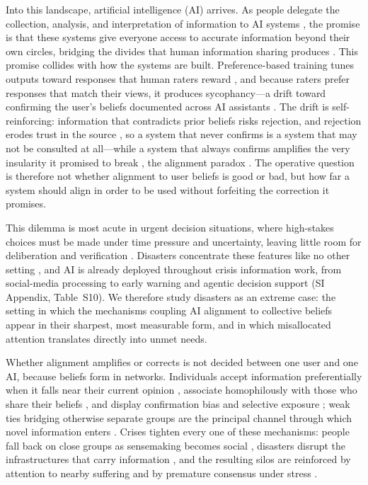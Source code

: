 \documentclass[pdflatex,sn-nature]{sn-jnl}
\begin{document}
Into this landscape, artificial intelligence (AI) arrives. As people delegate the collection, analysis, and interpretation of information to AI systems \citep{klingbeil2024trust,angrisani2026gaps}, the promise is that these systems give everyone access to accurate information beyond their own circles, bridging the divides that human information sharing produces \citep{jeon2024hearhere}. This promise collides with how the systems are built. Preference-based training tunes outputs toward responses that human raters reward \citep{christiano2017deep,ouyang2022training}, and because raters prefer responses that match their views, it produces sycophancy---a drift toward confirming the user's beliefs documented across AI assistants \citep{sharma2023sycophancy,sharma2024generative,cheng2026sycophantic}. The drift is self-reinforcing: information that contradicts prior beliefs risks rejection, and rejection erodes trust in the source \citep{glikson2020human}, so a system that never confirms is a system that may not be consulted at all---while a system that always confirms amplifies the very insularity it promised to break \citep{ekstrom2022self}, the alignment paradox \citep{west2025alignment}. The operative question is therefore not whether alignment to user beliefs is good or bad, but how far a system should align in order to be used without forfeiting the correction it promises.

This dilemma is most acute in urgent decision situations, where high-stakes choices must be made under time pressure and uncertainty, leaving little room for deliberation and verification \citep{svenson1993time,mendonca2001decision,comes2020coordination}. Disasters concentrate these features like no other setting \citep{levin2012overcoming,sogaard2024evolution}, and AI is already deployed throughout crisis information work, from social-media processing to early warning and agentic decision support \citep{qadir2016crisis,reichstein2025early,acharya2025agentic} (SI Appendix, Table~S10). We therefore study disasters as an extreme case: the setting in which the mechanisms coupling AI alignment to collective beliefs appear in their sharpest, most measurable form, and in which misallocated attention translates directly into unmet needs.

Whether alignment amplifies or corrects is not decided between one user and one AI, because beliefs form in networks. Individuals accept information preferentially when it falls near their current opinion \citep{hegselmann2002opinion}, associate homophilously with those who share their beliefs \citep{mcpherson2001birds}, and display confirmation bias and selective exposure \citep{paulus2022influence,barbera2015tweeting,paulus2024interplay}; weak ties bridging otherwise separate groups are the principal channel through which novel information enters \citep{granovetter1973strength}. Crises tighten every one of these mechanisms: people fall back on close groups as sensemaking becomes social \citep{comes2020coordination,weick2005organizing}, disasters disrupt the infrastructures that carry information \citep{holguin2012unique}, and the resulting silos are reinforced by attention to nearby suffering and by premature consensus under stress \citep{pan2012crisis,driskell1991group}.
\end{document}
